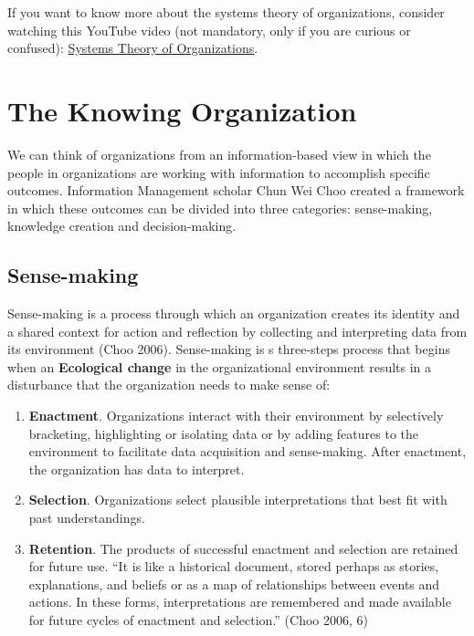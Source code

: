 \documentclass[
  letterpaper,
  DIV=11,
  numbers=noendperiod]{scrreprt}
\providecommand{\tightlist}{%
  \setlength{\itemsep}{0pt}\setlength{\parskip}{0pt}}
\begin{document}
If you want to know more about the systems theory of organizations,
consider watching this YouTube video (not mandatory, only if you are
curious or confused):
\href{https://www.youtube.com/watch?v=1L1c-EKOY-w&ab_channel=OrganizationalCommunicationChannel}{Systems
Theory of Organizations}.

\section{The Knowing Organization}\label{the-knowing-organization}

We can think of organizations from an information-based view in which
the people in organizations are working with information to accomplish
specific outcomes. Information Management scholar Chun Wei Choo created
a framework in which these outcomes can be divided into three
categories: sense-making, knowledge creation and decision-making.

\subsection{Sense-making}\label{sense-making}

Sense-making is a process through which an organization creates its
identity and a shared context for action and reflection by collecting
and interpreting data from its environment (Choo 2006). Sense-making is
s three-steps process that begins when an \textbf{Ecological change} in
the organizational environment results in a disturbance that the
organization needs to make sense of:

\begin{enumerate}
\def\labelenumi{\arabic{enumi}.}
\tightlist
\item
  \textbf{Enactment}. Organizations interact with their environment by
  selectively bracketing, highlighting or isolating data or by adding
  features to the environment to facilitate data acquisition and
  sense-making. After enactment, the organization has data to interpret.
\item
  \textbf{Selection}. Organizations select plausible interpretations
  that best fit with past understandings.
\item
  \textbf{Retention}. The products of successful enactment and selection
  are retained for future use. ``It is like a historical document,
  stored perhaps as stories, explanations, and beliefs or as a map of
  relationships between events and actions. In these forms,
  interpretations are remembered and made available for future cycles of
  enactment and selection.'' (Choo 2006, 6)
\end{enumerate}
\end{document}

